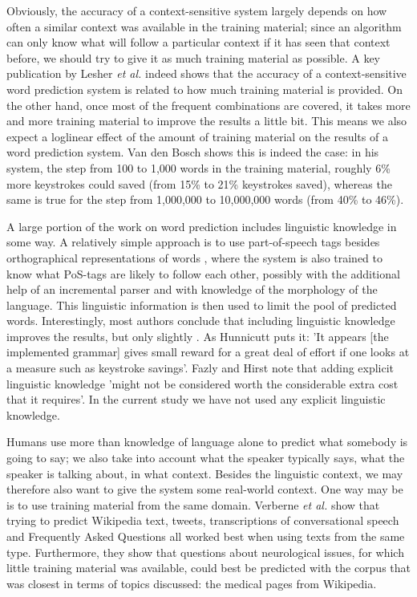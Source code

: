 \documentclass[11pt]{article}
\begin{document}
Obviously, the accuracy of a context-sensitive system largely depends on how often a similar context was available in the training material; since an algorithm can only know what will follow a particular context if it has seen that context before, we should try to give it as much training material as possible. A key publication by Lesher {\em et al.}  indeed shows that the accuracy of a context-sensitive word prediction system is related to how much training material is provided. On the other hand, once most of the frequent combinations are covered, it takes more and more training material to improve the results a little bit. This means we also expect a loglinear effect of the amount of training material on the results of a word prediction system. Van den Bosch  shows this is indeed the case: in his system, the step from 100 to 1,000 words in the training material, roughly 6\% more keystrokes could saved (from 15\% to 21\% keystrokes saved), whereas the same is true for the step from 1,000,000 to 10,000,000 words (from 40\% to 46\%).

A large portion of the work on word prediction includes linguistic knowledge in some way. A relatively simple approach is to use part-of-speech tags besides orthographical representations of words \cite{carlberger+97,Fazly+03,copestake97,Matiasek+02,garay-vitoria+97}, where the system is also trained to know what PoS-tags are likely to follow each other, possibly with the additional help of an incremental parser and with knowledge of the morphology of the language. This linguistic information is then used to limit the pool of predicted words. Interestingly, most authors conclude that including linguistic knowledge improves the results, but only slightly \cite{garay-vitoria+97,Fazly+03}. As Hunnicutt  puts it: 'It appears [the implemented grammar] gives small reward for a great deal of effort if one looks at a measure such as keystroke savings'. Fazly and Hirst  note that adding explicit linguistic knowledge 'might not be considered worth the considerable extra cost that it requires'. In the current study we have not used any explicit linguistic knowledge.

Humans use more than knowledge of language alone to predict what somebody is going to say; we also take into account what the speaker typically says, what the speaker is talking about, in what context. Besides the linguistic context, we may therefore also want to give the system some real-world context. One way may be is to use training material from the same domain. Verberne {\em et al.}  show that trying to predict Wikipedia text, tweets, transcriptions of conversational speech and Frequently Asked Questions all worked best when using texts from the same type. Furthermore, they show that questions about neurological issues, for which little training material was available, could best be predicted with the corpus that was closest in terms of topics discussed: the medical pages from Wikipedia. 
\end{document}
